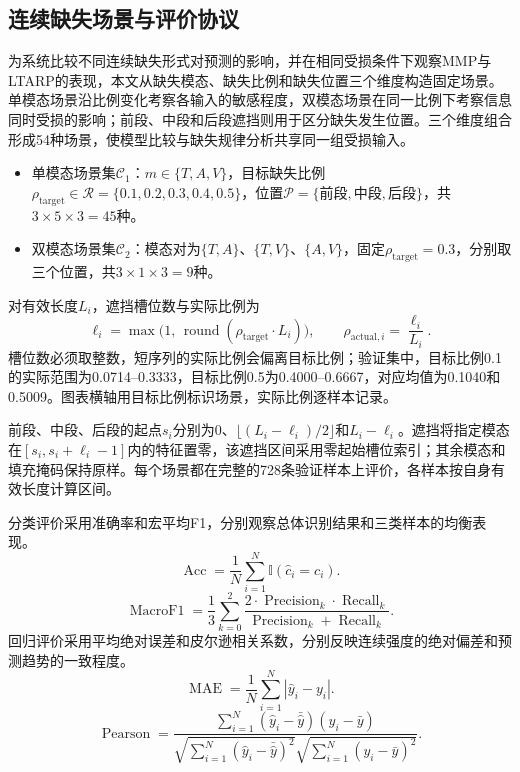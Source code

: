 \subsection{连续缺失场景与评价协议}\label{subsec:q2_benchmark}
\QTwoParagraph 为系统比较不同连续缺失形式对预测的影响，并在相同受损条件下观察MMP与LTARP的表现，本文从缺失模态、缺失比例和缺失位置三个维度构造固定场景。单模态场景沿比例变化考察各输入的敏感程度，双模态场景在同一比例下考察信息同时受损的影响；前段、中段和后段遮挡则用于区分缺失发生位置。三个维度组合形成54种场景，使模型比较与缺失规律分析共享同一组受损输入。

\begin{itemize}[leftmargin=2.5em,itemsep=0pt,topsep=2pt]
\item 单模态场景集$\mathcal C_1$：$m\in\{T,A,V\}$，目标缺失比例$\rho_{\mathrm{target}}\in\mathcal R=\{0.1,0.2,0.3,0.4,0.5\}$，位置$\mathcal P=\{\text{前段},\text{中段},\text{后段}\}$，共$3\times5\times3=45$种。
\item 双模态场景集$\mathcal C_2$：模态对为$\{T,A\}$、$\{T,V\}$、$\{A,V\}$，固定$\rho_{\mathrm{target}}=0.3$，分别取三个位置，共$3\times1\times3=9$种。
\end{itemize}

\QTwoParagraph 对有效长度$L_i$，遮挡槽位数与实际比例为
\begin{equation}
\ell_i = \max\big(1,\, \operatorname{round}(\rho_{\mathrm{target}} \cdot L_i)\big),\qquad
\rho_{\mathrm{actual}, i} = \frac{\ell_i}{L_i}.
\label{eq:q2_mask_len}
\end{equation}
槽位数必须取整数，短序列的实际比例会偏离目标比例；验证集中，目标比例0.1的实际范围为0.0714--0.3333，目标比例0.5为0.4000--0.6667，对应均值为0.1040和0.5009。图表横轴用目标比例标识场景，实际比例逐样本记录。

\QTwoParagraph 前段、中段、后段的起点$s_i$分别为$0$、$\lfloor(L_i-\ell_i)/2\rfloor$和$L_i-\ell_i$。遮挡将指定模态在$[s_i,s_i+\ell_i-1]$内的特征置零，该遮挡区间采用零起始槽位索引；其余模态和填充掩码保持原样。每个场景都在完整的728条验证样本上评价，各样本按自身有效长度计算区间。

\QTwoParagraph 分类评价采用准确率和宏平均F1，分别观察总体识别结果和三类样本的均衡表现。
\begin{equation*}
\operatorname{Acc} = \frac{1}{N}\sum_{i=1}^N \mathbb I(\hat c_i = c_i).
\end{equation*}
\begin{equation*}
\operatorname{MacroF1} = \frac{1}{3}\sum_{k=0}^2 \frac{2 \cdot \operatorname{Precision}_k \cdot \operatorname{Recall}_k}{\operatorname{Precision}_k + \operatorname{Recall}_k}.
\end{equation*}
\QTwoParagraph 回归评价采用平均绝对误差和皮尔逊相关系数，分别反映连续强度的绝对偏差和预测趋势的一致程度。
\begin{equation*}
\operatorname{MAE} = \frac{1}{N}\sum_{i=1}^N |\hat y_i - y_i|.
\end{equation*}
\begin{equation*}
\operatorname{Pearson} = \frac{\sum_{i=1}^N (\hat y_i - \bar{\hat y})(y_i - \bar y)}{\sqrt{\sum_{i=1}^N (\hat y_i - \bar{\hat y})^2}\sqrt{\sum_{i=1}^N (y_i - \bar y)^2}}.
\end{equation*}

